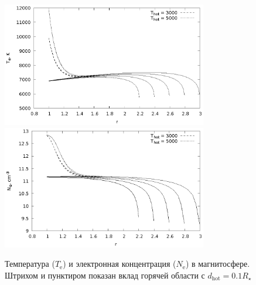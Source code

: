 \documentclass[12pt]{article}
\begin{document}
\begin{figure}[!h]
\centering
\includegraphics[width=0.8\textwidth]{T_e.eps}
\includegraphics[width=0.8\textwidth]{N_e.eps}
\caption{Температура ($T_\text{e}$) и электронная концентрация ($N_\text{e}$) в магнитосфере. Штрихом и пунктиром показан вклад горячей области с $d_\text{hot} = 0.1 R_\star$}
\label{fig:TeNe}
\end{figure}
\end{document}
